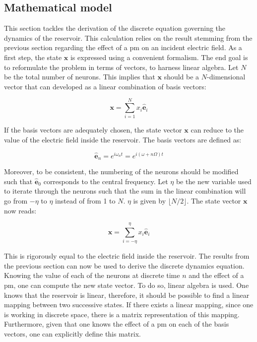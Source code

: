 
\subsection{Mathematical model}

\label{subsec-reservoir-model}

This section tackles the derivation of the discrete equation governing the dynamics of the reservoir. This calculation relies on the result stemming from the previous section regarding the effect of a \gls{pm} on an incident electric field. As a first step, the state $\mathbf{x}$ is expressed using a convenient formalism. The end goal is to reformulate the problem in terms of vectors, to harness linear algebra. Let $N$ be the total number of neurons. This implies that $\mathbf{x}$ should be a $N$-dimensional vector that can developed as a linear combination of basis vectors:

\begin{equation}
	\mathbf{x} = \sum_{i=1}^{N} x_i \hat{\mathbf{e}}_i
\end{equation}

If the basis vectors are adequately chosen, the state vector $\mathbf{x}$ can reduce to the value of the electric field inside the reservoir. The basis vectors are defined as:

\begin{equation}
	\hat{\mathbf{e}}_n = e^{i\omega_nt} = e^{i(\omega+n\Omega)t}
\end{equation}

Moreover, to be consistent, the numbering of the neurons should be modified such that $\hat{\mathbf{e}}_0$ corresponds to the central frequency. Let $\eta$ be the new variable used to iterate through the neurons such that the sum in the linear combination will go from $-\eta$ to $\eta$ instead of from 1 to $N$. $\eta$ is given by $\lfloor N/2 \rfloor$. The state vector $\mathbf{x}$ now reads:

\begin{equation}
	\mathbf{x} = \sum_{i=-\eta}^{\eta} x_i \hat{\mathbf{e}}_i
\end{equation}

This is rigorously equal to the electric field inside the reservoir. The results from the previous section can now be used to derive the discrete dynamics equation. Knowing the value of each of the neurons at discrete time $n$ and the effect of a \gls{pm}, one can compute the new state vector. To do so, linear algebra is used. One knows that the reservoir is linear, therefore, it should be possible to find a linear mapping between two successive states. If there exists a linear mapping, since one is working in discrete space, there is a matrix representation of this mapping. Furthermore, given that one knows the effect of a \gls{pm} on each of the basis vectors, one can explicitly define this matrix.

